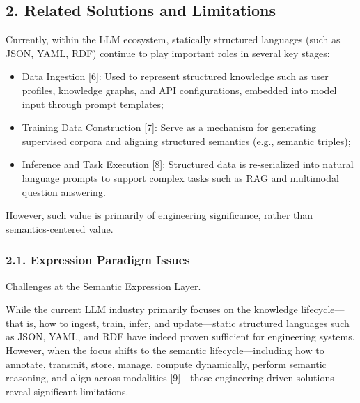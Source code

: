 \documentclass[conference]{IEEEtran}
\begin{document}
\subsection{2. Related Solutions and
Limitations}\label{2-related-solutions-and-limitations}

Currently, within the LLM ecosystem, statically structured languages
(such as JSON, YAML, RDF) continue to play important roles in several
key stages:

\begin{itemize}
\item
  Data Ingestion {[}6{]}: Used to represent structured knowledge such as
  user profiles, knowledge graphs, and API configurations, embedded into
  model input through prompt templates;
\item
  Training Data Construction {[}7{]}: Serve as a mechanism for
  generating supervised corpora and aligning structured semantics (e.g.,
  semantic triples);
\item
  Inference and Task Execution {[}8{]}: Structured data is re-serialized
  into natural language prompts to support complex tasks such as RAG and
  multimodal question answering.
\end{itemize}

However, such value is primarily of engineering significance, rather
than semantics-centered value.

\subsubsection{2.1. Expression Paradigm
Issues}\label{21-expression-paradigm-issues}

Challenges at the Semantic Expression Layer.

While the current LLM industry primarily focuses on the knowledge
lifecycle---that is, how to ingest, train, infer, and update---static
structured languages such as JSON, YAML, and RDF have indeed proven
sufficient for engineering systems. However, when the focus shifts to
the semantic lifecycle---including how to annotate, transmit, store,
manage, compute dynamically, perform semantic reasoning, and align
across modalities {[}9{]}---these engineering-driven solutions reveal
significant limitations.
\end{document}
